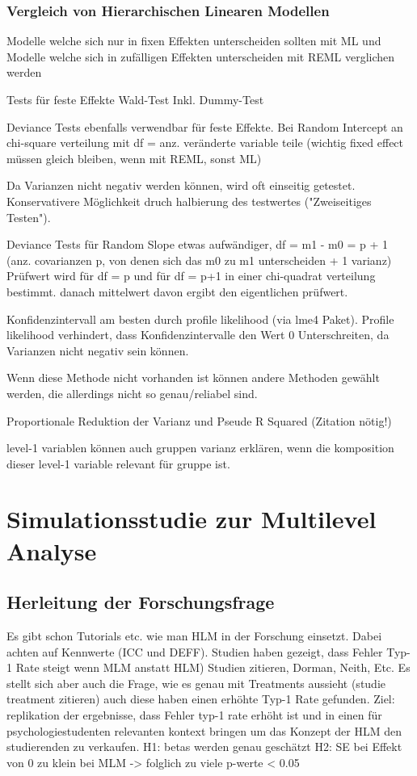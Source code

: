 \documentclass[12pt]{article}\usepackage[]{graphicx}\usepackage[]{color}
\numberwithin{equation}{section}
\begin{document}
\subsubsection{Vergleich von Hierarchischen Linearen Modellen}
Modelle welche sich nur in fixen Effekten unterscheiden sollten mit ML und Modelle welche sich in zufälligen Effekten unterscheiden mit REML verglichen werden \cite{SnijdersTomA.B2012Ma:a}

Tests für feste Effekte Wald-Test \cite{SnijdersTomA.B2012Ma:a} Inkl. Dummy-Test

Deviance Tests ebenfalls verwendbar für feste Effekte. Bei Random Intercept an chi-square verteilung mit df = anz. veränderte variable teile (wichtig fixed effect müssen gleich bleiben, wenn mit REML, sonst ML)

Da Varianzen nicht negativ werden können, wird oft einseitig getestet. Konservativere Möglichkeit druch halbierung des testwertes ("Zweiseitiges Testen").


Deviance Tests für Random Slope etwas aufwändiger, df = m1 - m0 = p + 1 (anz. covarianzen p, von denen sich das m0 zu m1 unterscheiden + 1 varianz) Prüfwert wird für df = p und für df = p+1 in einer chi-quadrat verteilung bestimmt. danach mittelwert davon ergibt den eigentlichen prüfwert. 

Konfidenzintervall am besten durch profile likelihood (via lme4 Paket). Profile likelihood verhindert, dass Konfidenzintervalle den Wert 0 Unterschreiten, da Varianzen nicht negativ sein können. 

Wenn diese Methode nicht vorhanden ist können andere Methoden gewählt werden, die allerdings nicht so genau/reliabel sind.

Proportionale Reduktion der Varianz und Pseude R Squared (Zitation nötig!)


level-1 variablen können auch gruppen varianz erklären, wenn die komposition dieser level-1 variable relevant für gruppe ist.

\section{Simulationsstudie zur Multilevel Analyse}
\subsection{Herleitung der Forschungsfrage}
Es gibt schon Tutorials etc. wie man HLM in der Forschung einsetzt. Dabei achten auf Kennwerte (ICC und DEFF). Studien haben gezeigt, dass Fehler Typ-1 Rate steigt wenn MLM anstatt HLM) Studien zitieren, Dorman, Neith, Etc. Es stellt sich aber auch die Frage, wie es genau mit Treatments aussieht (studie treatment zitieren) auch diese haben einen erhöhte Typ-1 Rate gefunden. Ziel: replikation der ergebnisse, dass Fehler typ-1 rate erhöht ist und in einen für psychologiestudenten relevanten kontext bringen um das Konzept der HLM den studierenden zu verkaufen. 
H1: betas werden genau geschätzt
H2: SE bei Effekt von 0 zu klein bei MLM -> folglich zu viele p-werte < 0.05
\end{document}
